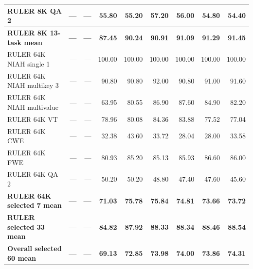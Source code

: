 \begin{longtable}{@{}lrrrrrrrr@{}}
RULER 8K QA 2 & --- & --- & 55.80 & 55.20 & 57.20 & 56.00 & 54.80 & 54.40 \\
\hline
\textbf{RULER 8K 13-task mean} & \textbf{---} & \textbf{---} & \textbf{87.45} & \textbf{90.24} & \textbf{90.91} & \textbf{91.09} & \textbf{91.29} & \textbf{91.45} \\
\hline
RULER 64K NIAH single 1 & --- & --- & 100.00 & 100.00 & 100.00 & 100.00 & 100.00 & 100.00 \\
RULER 64K NIAH multikey 3 & --- & --- & 90.80 & 90.80 & 92.00 & 90.80 & 91.00 & 91.60 \\
RULER 64K NIAH multivalue & --- & --- & 63.95 & 80.55 & 86.90 & 87.60 & 84.90 & 82.20 \\
RULER 64K VT & --- & --- & 78.96 & 80.08 & 84.36 & 83.88 & 77.52 & 77.04 \\
RULER 64K CWE & --- & --- & 32.38 & 43.60 & 33.72 & 28.04 & 28.00 & 33.58 \\
RULER 64K FWE & --- & --- & 80.93 & 85.20 & 85.13 & 85.93 & 86.60 & 86.00 \\
RULER 64K QA 2 & --- & --- & 50.20 & 50.20 & 48.80 & 47.40 & 47.60 & 45.60 \\
\hline
\textbf{RULER 64K selected 7 mean} & \textbf{---} & \textbf{---} & \textbf{71.03} & \textbf{75.78} & \textbf{75.84} & \textbf{74.81} & \textbf{73.66} & \textbf{73.72} \\
\hline
\hline
\textbf{RULER selected 33 mean} & \textbf{---} & \textbf{---} & \textbf{84.82} & \textbf{87.92} & \textbf{88.33} & \textbf{88.34} & \textbf{88.46} & \textbf{88.54} \\
\hline
\hline
\textbf{Overall selected 60 mean} & \textbf{---} & \textbf{---} & \textbf{69.13} & \textbf{72.85} & \textbf{73.98} & \textbf{74.00} & \textbf{73.86} & \textbf{74.31} \\
\hline
\end{longtable}
\endgroup
\clearpage

